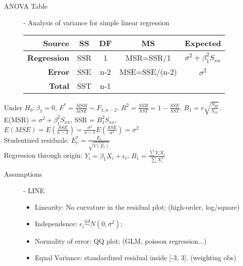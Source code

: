 \documentclass[10pt,landscape]{article}
\begin{document}
\begin{multicols}{3}
    \begin{description}
    \item[ANOVA Table] - Analysis of variance for simple linear regression \\
        \begin{center}
            \begin{tabular}{r|cccc}
                \textbf{Source}  & \textbf{SS} & \textbf{DF} & \textbf{MS} &\textbf{ Expected}  \\ \hline
                \textbf{Regression} & SSR & 1 & MSR=SSR/1 & $\sigma^2 + \beta_1^2S_{xx}$\\
                \textbf{Error} & SSE & n-2 & MSE=SSE/(n-2) & $\sigma^2$ \\
                \textbf{Total} & SST &  n-1 &\  & \  \\
            \end{tabular}
        \end{center}
\end{description}
    Under $H_0: \beta_1=0$, $F^* = \frac{MSR}{MSE}\sim F_{1,n-2}$. $R^2 = \frac{SSR}{SST} = 1-\frac{SSE}{SST}$. $B_1 = r\sqrt{\frac{S_{yy}}{S_{xx}}}$. \\
    E(MSR) = $\sigma^2 + \beta_1^2S_{xx}$, SSR = $B_1^2S_{xx}$, $E(MSE) = E(\frac{SSE}{n-2}) = \frac{\sigma^2}{n-1}E(\frac{SSE}{\sigma^2}) = \sigma^2$\\
    Studentized residuals: $E_i^* = \frac{E_i}{\sqrt{\hat{V(E_i)}}}$ \\
    Regression through origin: $Y_i = \beta_1 X_i + \epsilon_i$, $B_1 = \frac{\sum Y_iX_i}{\sum X_i^2}$ \\
    
    \begin{description}
    \item[Assumptions]  - LINE
    \begin{itemize}
    		\item Linearity: No curvature in the residual plot; (high-order, log/square)
    		\item Independence: $\epsilon_i \overset{iid}{\sim} N(0, \sigma^2)$;
    		\item Normality of error: QQ plot; (GLM, poisson regression...)
    		\item Equal Variance: standardized residual inside [-3, 3]. (weighting obs)
    \end{itemize}
    \end{description}



\end{multicols}
\end{document}

